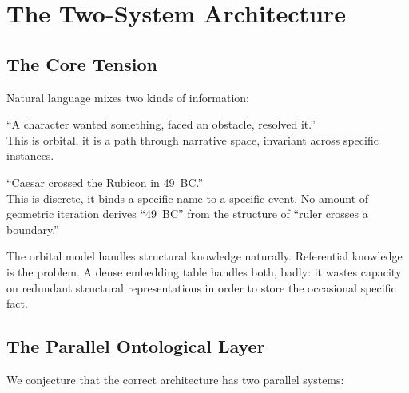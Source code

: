 \documentclass[11pt, a4paper]{article}
\theoremstyle{remark}
\begin{document}
\section{The Two-System Architecture}\label{sec:twosystem}

\subsection{The Core Tension}

Natural language mixes two kinds of information:

\begin{description}[nosep, leftmargin=1.5em]
    \item[Structural:] ``A character wanted something, faced an obstacle, resolved it.'' \\
    This is orbital, it is a path through narrative space, invariant across specific instances.

    \item[Referential:] ``Caesar crossed the Rubicon in 49~BC.'' \\
    This is discrete, it binds a specific name to a specific event. No amount of geometric iteration derives ``49~BC'' from the structure of ``ruler crosses a boundary.''
\end{description}

The orbital model handles structural knowledge naturally.
Referential knowledge is the problem.
A dense embedding table handles both, badly: it wastes capacity on redundant structural representations in order to store the occasional specific fact.

\subsection{The Parallel Ontological Layer}

We conjecture that the correct architecture has two parallel systems:
\end{document}
